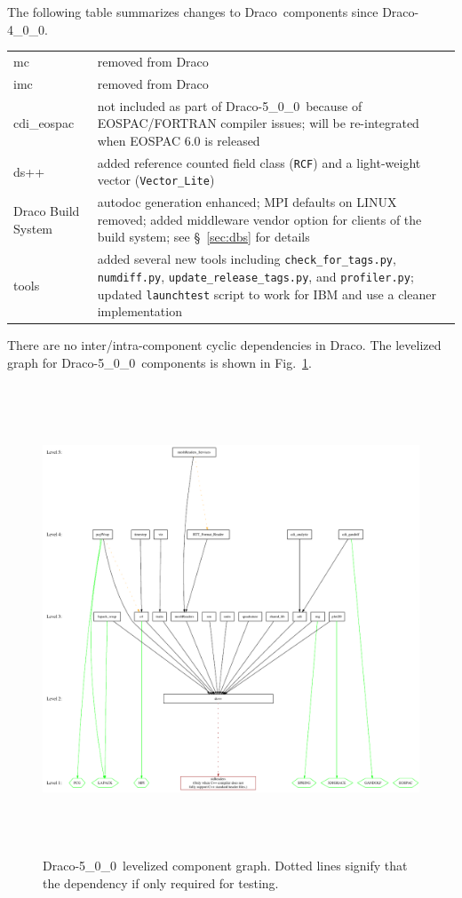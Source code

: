 \documentclass[note]{ResearchNote_pdf}
\newcommand{\draco}{Draco}
\newcommand{\dracor}{\draco-5\_0\_0}
\newcommand{\tableText}[1]{{\raggedright #1}}
\begin{document}
The following table summarizes changes to \draco\ components since
\draco-4\_0\_0. 
\begin{center}
  \begin{tabular}{lp{4.0in}}
    \hline\hline 

    mc & \tableText{removed from \draco} \\
    imc & \tableText{removed from \draco} \\
    cdi\_eospac & \tableText{not included as part of \dracor\ because
      of EOSPAC/FORTRAN compiler issues; will be re-integrated when
      EOSPAC 6.0 is released} \\
    ds++ & \tableText{added reference counted field class
      (\texttt{RCF}) and a light-weight vector
      (\texttt{Vector\_Lite})} \\ 
    Draco Build System & \tableText{autodoc generation enhanced; MPI
      defaults on LINUX removed; added middleware vendor option for
      clients of the build system; see \S~\ref{sec:dbs} for details} \\
    tools & \tableText{added several new tools including
      \texttt{check\_for\_tags.py}, \texttt{numdiff.py},
      \texttt{update\_release\_tags.py}, and \texttt{profiler.py};
      updated \texttt{launchtest} script to work for IBM and use a
      cleaner implementation} \\
    \hline\hline 
  \end{tabular}
\end{center}

There are no inter/intra-component cyclic dependencies in \draco.  The
levelized graph for \dracor\ components is shown in
Fig.~\ref{fig:level}.
\begin{figure}
  \label{fig:level}
  \centerline{
    \includegraphics[height=5.5in]{level-5_0_0}}
  \caption{\dracor\ levelized component graph.  Dotted lines signify
    that the dependency if only required for testing.}
\end{figure}
\end{document}
